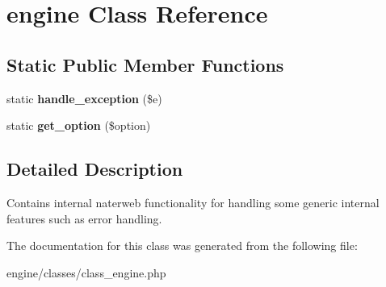 \hypertarget{classengine}{\section{engine Class Reference}
\label{classengine}
}
\subsection*{Static Public Member Functions}
\begin{DoxyCompactItemize}
\item 
\hypertarget{classengine_a64c1ff9adad7e9ecc08ff1d832d14f1d}{static {\bfseries handle\-\_\-exception} (\$e)}\label{classengine_a64c1ff9adad7e9ecc08ff1d832d14f1d}

\item 
\hypertarget{classengine_a06db5cb5595cf6e64e3cda77e0c0b4bc}{static {\bfseries get\-\_\-option} (\$option)}\label{classengine_a06db5cb5595cf6e64e3cda77e0c0b4bc}

\end{DoxyCompactItemize}


\subsection{Detailed Description}
Contains internal naterweb functionality for handling some generic internal features such as error handling. 

The documentation for this class was generated from the following file\-:\begin{DoxyCompactItemize}
\item 
engine/classes/class\-\_\-engine.\-php\end{DoxyCompactItemize}
